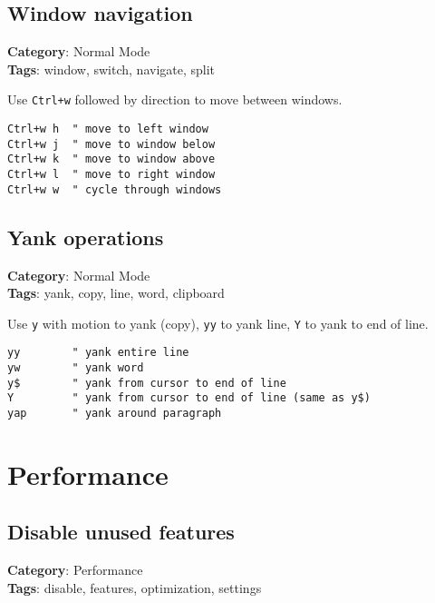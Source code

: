 {{{{{{{{{{\section{Window navigation}

\textbf{Category}: Normal Mode\\ \textbf{Tags}: window, switch, navigate, split
\vspace{0.5cm}

Use {\footnotesize \Verb§Ctrl+w§} followed by direction to move between windows.

\begin{Exa*}{}
\begin{Verbatim}[fontsize=\footnotesize, breaklines, breakanywhere]
Ctrl+w h  " move to left window
Ctrl+w j  " move to window below
Ctrl+w k  " move to window above
Ctrl+w l  " move to right window
Ctrl+w w  " cycle through windows
\end{Verbatim}
\end{Exa*}

\section{Yank operations}

\textbf{Category}: Normal Mode\\ \textbf{Tags}: yank, copy, line, word, clipboard
\vspace{0.5cm}

Use {\footnotesize \Verb§y§} with motion to yank (copy), {\footnotesize \Verb§yy§} to yank line, {\footnotesize \Verb§Y§} to yank to end of line.

\begin{Exa*}{}
\begin{Verbatim}[fontsize=\footnotesize, breaklines, breakanywhere]
yy        " yank entire line
yw        " yank word
y$        " yank from cursor to end of line
Y         " yank from cursor to end of line (same as y$)
yap       " yank around paragraph
\end{Verbatim}
\end{Exa*}

\chapter{Performance}
\section{Disable unused features}

\textbf{Category}: Performance\\ \textbf{Tags}: disable, features, optimization, settings
\vspace{0.5cm}

}}}}}}}}}}
